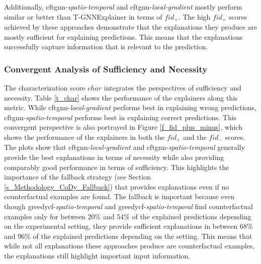 Additionally, \gls{cftgnn}-\textit{spatio-temporal} and \gls{cftgnn}-\textit{local-gradient} mostly perform similar or better than T-GNNExplainer in terms of $fid_+$. The high $fid_+$ scores achieved by these approaches demonstrate that the explanations they produce are mostly sufficient for explaining predictions. This means that the explanations successfully capture information that is relevant to the prediction.



\FloatBarrier
\subsubsection{Convergent Analysis of Sufficiency and Necessity}
\label{s_Evaluation_Results_ConvergentAnalysis}

The characterization score $char$ integrates the perspectives of sufficiency and necessity. Table \ref{t_char} shows the performance of the explainers along this metric. While \gls{cftgnn}-\textit{local-gradient} performs best in explaining wrong predictions, \gls{cftgnn}-\textit{spatio-temporal} performs best in explaining correct predictions. This convergent perspective is also portrayed in Figure \ref{f_fid_plus_minus}, which shows the performance of the explainers in both the $fid_+$ and the $fid_-$ scores. The plots show that \gls{cftgnn}-\textit{local-gradient} and \gls{cftgnn}-\textit{spatio-temporal} generally provide the best explanations in terms of necessity while also providing comparably good performance in terms of sufficiency. This highlights the importance of the fallback strategy (see Section \ref{s_Methodology_CoDy_Fallback}) that provides explanations even if no counterfactual examples are found. The fallback is important because even though \gls{greedycf}-\textit{spatio-temporal} and \gls{greedycf}-\textit{spatio-temporal} find counterfactual examples only for between $20\%$ and $54\%$ of the explained predictions depending on the experimental setting, they provide sufficient explanations in between $68\%$ and $96\%$ of the explained predictions depending on the setting. This means that while not all explanations these approaches produce are counterfactual examples, the explanations still highlight important input information.


